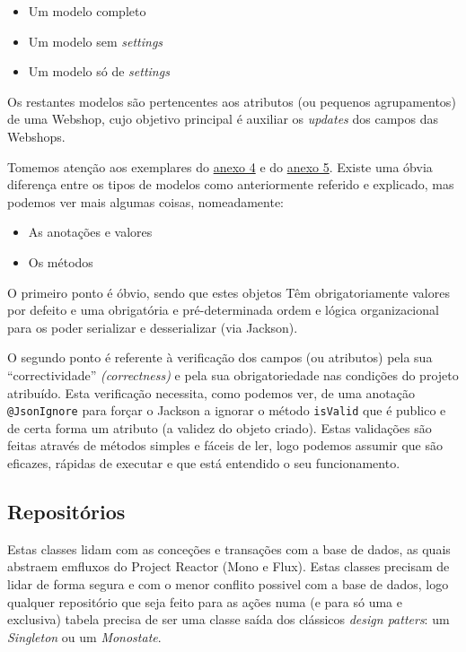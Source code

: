 \begin{itemize}
  \item Um modelo completo
  \item Um modelo sem \textit{settings}
  \item Um modelo só de \textit{settings}
\end{itemize}

Os restantes modelos são pertencentes aos atributos (ou pequenos agrupamentos) de uma Webshop, cujo objetivo principal é auxiliar os \textit{updates} dos campos das Webshops.

Tomemos atenção aos exemplares do \hyperref[an4]{anexo 4} e do \hyperref[an5]{anexo 5}. Existe uma óbvia diferença entre os tipos de modelos como anteriormente referido e explicado, mas podemos ver mais algumas coisas, nomeadamente:

\begin{itemize}
  \item As anotações e valores
  \item Os métodos
\end{itemize}

O primeiro ponto é óbvio, sendo que estes objetos Têm obrigatoriamente valores por defeito e uma obrigatória e pré-determinada ordem e lógica organizacional para os poder serializar e desserializar (via Jackson).

O segundo ponto é referente à verificação dos campos (ou atributos) pela sua ``correctividade'' \textit{(correctness)} e pela sua obrigatoriedade nas condições do projeto atribuído. Esta verificação necessita, como podemos ver, de uma anotação \texttt{@JsonIgnore} para forçar o Jackson a ignorar o método \texttt{isValid} que é publico e de certa forma um atributo (a validez do objeto criado). Estas validações são feitas através de métodos simples e fáceis de ler, logo podemos assumir que são eficazes, rápidas de executar e que está entendido o seu funcionamento.

\newpage

\subsection{Repositórios}

Estas classes lidam com as conceções e transações com a base de dados, as quais abstraem emfluxos do Project Reactor (Mono e Flux). Estas classes precisam de lidar de forma segura e com o menor conflito possivel com a base de dados, logo qualquer repositório que seja feito para as ações numa (e para só uma e exclusiva) tabela precisa de ser uma classe saída dos clássicos \textit{design patters}: um \textit{Singleton} ou um \textit{Monostate}.

